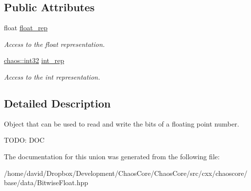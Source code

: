 \subsection*{Public Attributes}
\begin{DoxyCompactItemize}
\item 
\hypertarget{unionchaos_1_1data_1_1_bitwise_float_ab763103c6f0079798d187c8c27612259}{float \hyperlink{unionchaos_1_1data_1_1_bitwise_float_ab763103c6f0079798d187c8c27612259}{float\-\_\-rep}}\label{unionchaos_1_1data_1_1_bitwise_float_ab763103c6f0079798d187c8c27612259}

\begin{DoxyCompactList}\small\item\em Access to the float representation. \end{DoxyCompactList}\item 
\hypertarget{unionchaos_1_1data_1_1_bitwise_float_aca337da432b03bc3802e6a91952dd99d}{\hyperlink{namespacechaos_aba819cd899114dc5873e32e7b26411c4}{chaos\-::int32} \hyperlink{unionchaos_1_1data_1_1_bitwise_float_aca337da432b03bc3802e6a91952dd99d}{int\-\_\-rep}}\label{unionchaos_1_1data_1_1_bitwise_float_aca337da432b03bc3802e6a91952dd99d}

\begin{DoxyCompactList}\small\item\em Access to the int representation. \end{DoxyCompactList}\end{DoxyCompactItemize}


\subsection{Detailed Description}
Object that can be used to read and write the bits of a floating point number. 

T\-O\-D\-O\-: D\-O\-C 

The documentation for this union was generated from the following file\-:\begin{DoxyCompactItemize}
\item 
/home/david/\-Dropbox/\-Development/\-Chaos\-Core/\-Chaos\-Core/src/cxx/chaoscore/base/data/Bitwise\-Float.\-hpp\end{DoxyCompactItemize}

